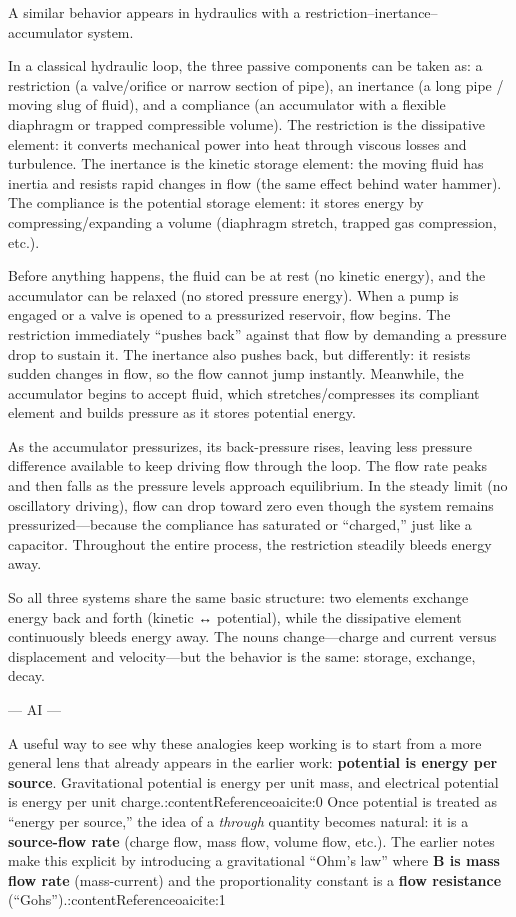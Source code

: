 \documentclass[
  letterpaper,
  DIV=11,
  numbers=noendperiod]{scrartcl}
\begin{document}
A similar behavior appears in hydraulics with a
restriction--inertance--accumulator system.

In a classical hydraulic loop, the three passive components can be taken
as: a restriction (a valve/orifice or narrow section of pipe), an
inertance (a long pipe / moving slug of fluid), and a compliance (an
accumulator with a flexible diaphragm or trapped compressible volume).
The restriction is the dissipative element: it converts mechanical power
into heat through viscous losses and turbulence. The inertance is the
kinetic storage element: the moving fluid has inertia and resists rapid
changes in flow (the same effect behind water hammer). The compliance is
the potential storage element: it stores energy by compressing/expanding
a volume (diaphragm stretch, trapped gas compression, etc.).

Before anything happens, the fluid can be at rest (no kinetic energy),
and the accumulator can be relaxed (no stored pressure energy). When a
pump is engaged or a valve is opened to a pressurized reservoir, flow
begins. The restriction immediately ``pushes back'' against that flow by
demanding a pressure drop to sustain it. The inertance also pushes back,
but differently: it resists sudden changes in flow, so the flow cannot
jump instantly. Meanwhile, the accumulator begins to accept fluid, which
stretches/compresses its compliant element and builds pressure as it
stores potential energy.

As the accumulator pressurizes, its back-pressure rises, leaving less
pressure difference available to keep driving flow through the loop. The
flow rate peaks and then falls as the pressure levels approach
equilibrium. In the steady limit (no oscillatory driving), flow can drop
toward zero even though the system remains pressurized---because the
compliance has saturated or ``charged,'' just like a capacitor.
Throughout the entire process, the restriction steadily bleeds energy
away.

So all three systems share the same basic structure: two elements
exchange energy back and forth (kinetic ↔ potential), while the
dissipative element continuously bleeds energy away. The nouns
change---charge and current versus displacement and velocity---but the
behavior is the same: storage, exchange, decay.

--- AI ---

A useful way to see why these analogies keep working is to start from a
more general lens that already appears in the earlier work:
\textbf{potential is energy per source}. Gravitational potential is
energy per unit mass, and electrical potential is energy per unit
charge.:contentReference{oaicite:0} Once potential is treated as
``energy per source,'' the idea of a \emph{through} quantity becomes
natural: it is a \textbf{source-flow rate} (charge flow, mass flow,
volume flow, etc.). The earlier notes make this explicit by introducing
a gravitational ``Ohm's law'' where \textbf{B is mass flow rate}
(mass-current) and the proportionality constant is a \textbf{flow
resistance} (``Gohs'').:contentReference{oaicite:1}
\end{document}
